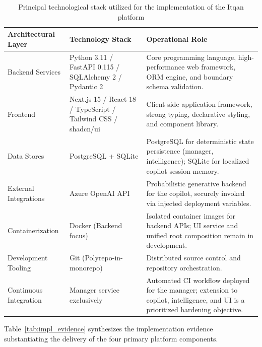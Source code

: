 \begin{table}[H]
\centering
\scriptsize
\renewcommand{\arraystretch}{1.3}
\begin{tabular}{|p{3.4cm}|p{4.6cm}|p{6cm}|}
\hline
\rowcolor{lightgray}
\textbf{Architectural Layer} & \textbf{Technology Stack} & \textbf{Operational Role} \\ \hline
Backend Services & Python 3.11 / FastAPI 0.115 / SQLAlchemy 2 / Pydantic 2 & Core programming language, high-performance web framework, ORM engine, and boundary schema validation. \\ \hline
Frontend & Next.js 15 / React 18 / TypeScript / Tailwind CSS / shadcn/ui & Client-side application framework, strong typing, declarative styling, and component library. \\ \hline
Data Stores & PostgreSQL + SQLite & PostgreSQL for deterministic state persistence (manager, intelligence); SQLite for localized copilot session memory. \\ \hline
External Integrations & Azure OpenAI API & Probabilistic generative backend for the copilot, securely invoked via injected deployment variables. \\ \hline
Containerization & Docker (Backend focus) & Isolated container images for backend APIs; UI service and unified root composition remain in development. \\ \hline
Development Tooling & Git (Polyrepo-in-monorepo) & Distributed source control and repository orchestration. \\ \hline
Continuous Integration & Manager service exclusively & Automated CI workflow deployed for the manager; extension to copilot, intelligence, and UI is a prioritized hardening objective. \\ \hline
\end{tabular}
\caption{Principal technological stack utilized for the implementation of the Itqan platform}
\label{tab:toolchain}
\end{table}

Table~\ref{tab:impl_evidence} synthesizes the implementation evidence substantiating the delivery of the four primary platform components.


